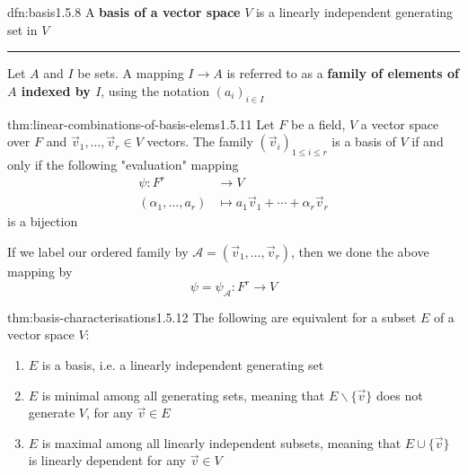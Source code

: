 \documentclass[landscape, 8pt]{extarticle}
\begin{document}
\begin{multicols}{3}
\begin{dfn}{dfn:basis}{1.5.8}
    A \textbf{basis of a vector space} $V$ is a linearly independent generating set in $V$

    \noindent\rule{\textwidth}{0.2pt}
    Let $A$ and $I$ be sets. A mapping $I\to A$ is referred to as a \textbf{family of elements of $A$ indexed by $I$}, using the notation $(a_{i})_{i\in I}$
\end{dfn}


\begin{thm}{thm:linear-combinations-of-basis-elems}{1.5.11}
    Let $F$ be a field, $V$ a vector space over $F$ and $\vec{v}_{1},\dots,\vec{v}_{r}\in V$ vectors. The family $(\vec{v}_{i})_{1\le i\le r}$ is a basis of $V$ if and only if the following "evaluation" mapping
    \begin{align*}
        \psi : F^{r} &\to V\\
        (\alpha_{1},\dots,a_{r}) &\mapsto a_{1}\vec{v}_{1} + \cdots + \alpha_{r}\vec{v}_{r}
    \end{align*}
    is a bijection

    If we label our ordered family by $\mathcal{A} = (\vec{v}_{1},\dots,\vec{v}_{r})$, then we done the above mapping by
    \[\psi = \psi_{\mathcal{A}} : F^{r}\to V\]
\end{thm}

\vspace{-5pt}
\begin{thm}{thm:basis-characterisations}{1.5.12}
    The following are equivalent for a subset $E$ of a vector space $V$:
    \vspace{-5pt}
    \begin{enumerate}
        \setlength\itemsep{0em}
        \item $E$ is a basis, i.e. a linearly independent generating set
        \item $E$ is minimal among all generating sets, meaning that $E \backslash \{\vec{v}\}$ does not generate $V$, for any $\vec{v}\in E$
        \item $E$ is maximal among all linearly independent subsets, meaning that $E \cup \{\vec{v}\}$ is linearly dependent for any $\vec{v}\in V$
    \end{enumerate}


\end{thm}
\end{multicols}
\end{document}
